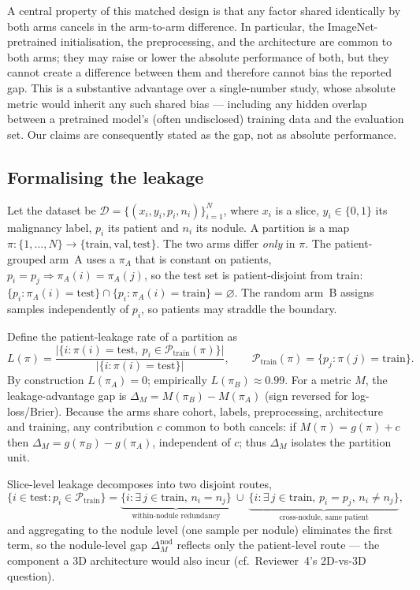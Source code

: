 \documentclass{article}
\begin{document}
A central property of this matched design is that any factor shared identically by both arms
cancels in the arm-to-arm difference. In particular, the ImageNet-pretrained initialisation, the
preprocessing, and the architecture are common to both arms; they may raise or lower the absolute
performance of both, but they cannot create a difference between them and therefore cannot bias the
reported gap. This is a substantive advantage over a single-number study, whose absolute metric
would inherit any such shared bias --- including any hidden overlap between a pretrained model's
(often undisclosed) training data and the evaluation set. Our claims are consequently stated as the
gap, not as absolute performance.

\subsection{Formalising the leakage}
Let the dataset be $\mathcal{D}=\{(x_i,y_i,p_i,n_i)\}_{i=1}^{N}$, where $x_i$ is a slice, $y_i\in\{0,1\}$
its malignancy label, $p_i$ its patient and $n_i$ its nodule. A partition is a map
$\pi:\{1,\dots,N\}\to\{\mathrm{train},\mathrm{val},\mathrm{test}\}$. The two arms differ \emph{only}
in $\pi$. The patient-grouped arm~A uses a $\pi_A$ that is constant on patients,
$p_i=p_j \Rightarrow \pi_A(i)=\pi_A(j)$, so the test set is patient-disjoint from train:
$\{p_i:\pi_A(i)=\mathrm{test}\}\cap\{p_i:\pi_A(i)=\mathrm{train}\}=\varnothing$. The random arm~B
assigns samples independently of $p_i$, so patients may straddle the boundary.

Define the patient-leakage rate of a partition as
\begin{equation}
L(\pi)=\frac{\bigl|\{i:\pi(i)=\mathrm{test},\ p_i\in\mathcal{P}_{\mathrm{train}}(\pi)\}\bigr|}
{\bigl|\{i:\pi(i)=\mathrm{test}\}\bigr|},\qquad
\mathcal{P}_{\mathrm{train}}(\pi)=\{p_j:\pi(j)=\mathrm{train}\}.
\end{equation}
By construction $L(\pi_A)=0$; empirically $L(\pi_B)\approx0.99$. For a metric $M$, the
leakage-advantage gap is $\Delta_M=M(\pi_B)-M(\pi_A)$ (sign reversed for log-loss/Brier). Because
the arms share cohort, labels, preprocessing, architecture and training, any contribution $c$
common to both cancels: if $M(\pi)=g(\pi)+c$ then $\Delta_M=g(\pi_B)-g(\pi_A)$, independent of $c$;
thus $\Delta_M$ isolates the partition unit.

Slice-level leakage decomposes into two disjoint routes,
\begin{equation}
\{i\in\mathrm{test}:p_i\in\mathcal{P}_{\mathrm{train}}\}=
\underbrace{\{i:\exists\,j\in\mathrm{train},\,n_i=n_j\}}_{\text{within-nodule redundancy}}\ \cup\
\underbrace{\{i:\exists\,j\in\mathrm{train},\,p_i=p_j,\,n_i\neq n_j\}}_{\text{cross-nodule, same patient}},
\end{equation}
and aggregating to the nodule level (one sample per nodule) eliminates the first term, so the
nodule-level gap $\Delta_M^{\mathrm{nod}}$ reflects only the patient-level route --- the component a
3D architecture would also incur (cf.\ Reviewer~4's 2D-vs-3D question).
\end{document}
